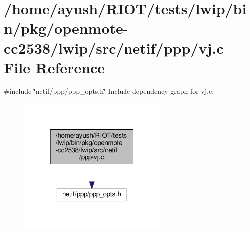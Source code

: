 \hypertarget{openmote-cc2538_2lwip_2src_2netif_2ppp_2vj_8c}{}\section{/home/ayush/\+R\+I\+O\+T/tests/lwip/bin/pkg/openmote-\/cc2538/lwip/src/netif/ppp/vj.c File Reference}
\label{openmote-cc2538_2lwip_2src_2netif_2ppp_2vj_8c}
{\ttfamily \#include \char`\"{}netif/ppp/ppp\+\_\+opts.\+h\char`\"{}}\newline
Include dependency graph for vj.\+c\+:
\nopagebreak
\begin{figure}[H]
\begin{center}
\leavevmode
\includegraphics[width=205pt]{openmote-cc2538_2lwip_2src_2netif_2ppp_2vj_8c__incl}
\end{center}
\end{figure}
